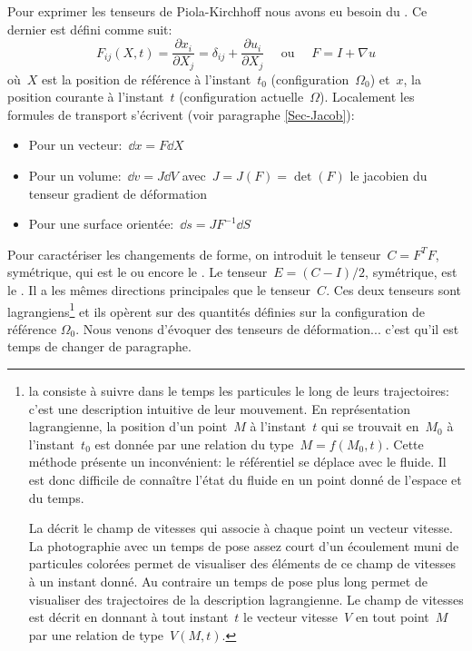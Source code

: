 \medskipvm
Pour exprimer les tenseurs de Piola-Kirchhoff nous avons eu besoin du . Ce dernier est défini comme suit: 
\begin{equation} F_{ij}(X,t) = \dfrac{\partial x_i}{\partial X_j} = \delta_{ij} + \frac{\partial u_i}{\partial X_j}
\quad \text{ ou } \quad F = I + \nabla u\end{equation}
où~$X$ est la position de référence à l'instant~$t_0$ (configuration~$\Omega_0$) et~$x$, la position courante à l'instant~$t$ (configuration actuelle~$\Omega$).
\medskipvm
Localement les formules de transport s'écrivent (voir paragraphe \ref{Sec-Jacob}):
\begin{itemize}
  \item Pour un vecteur:~$\dd x = F \dd X$
  \item Pour un volume:~$\dd v = J \dd V$ avec~$J= J(F) = \det(F)$ le jacobien du tenseur gradient de déformation
  \item Pour une surface orientée:~$\dd s = J F^{-1} \dd S$
\end{itemize}
\medskipvm
Pour caractériser les changements de forme, on introduit le tenseur~$C = F^TF$, symétrique, qui est le  ou encore le .
\medskipvm
Le tenseur~$E = (C-I)/2$, symétrique, est le . Il a les mêmes directions principales que le tenseur~$C$.
\medskipvm
Ces deux tenseurs sont lagrangiens\footnote{la  consiste à suivre dans le temps les particules le long de leurs trajectoires: c'est une description intuitive de leur mouvement.
En représentation lagrangienne, la position d'un point~$M$ à l'instant~$t$ qui se trouvait en~$M_0$ à l'instant~$t_0$ est donnée par une relation du type~$M = f(M_0,t)$. Cette méthode présente un inconvénient: le référentiel se déplace avec le fluide. Il est donc difficile de connaître l'état du fluide en un point donné de l'espace et du temps.

\medskip
La  décrit le champ de vitesses qui associe à chaque point un vecteur vitesse. La photographie avec un temps de pose assez court d'un écoulement muni de particules colorées permet de visualiser des éléments de ce champ de vitesses à un instant donné. Au contraire un temps de pose plus long permet de visualiser des trajectoires de la description lagrangienne. Le champ de vitesses est décrit en donnant à tout instant~$t$ le vecteur vitesse~$V$ en tout point~$M$ par une relation de type~$V(M,t)$.} et ils opèrent sur des quantités définies sur la configuration de référence $\Omega_0$.
\medskipvm
Nous venons d'évoquer des tenseurs de déformation... c'est qu'il est temps de changer de paragraphe.


